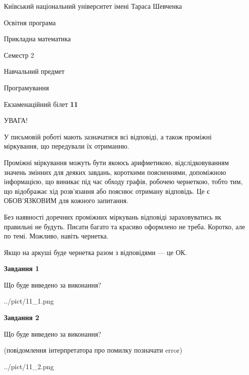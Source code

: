 \documentclass[12pt, ukrainian]{article}
\begin{document}
{{\begin {small}\par
{ \center  Київський національний університет імені Тараса Шевченка \par}
{\parbox {5 cm}{Освітня програма \hfill}{\parbox {7 cm}{Прикладна математика\hfill}}\parbox {6 cm}{\hfill Семестр 2}}\par
{\parbox {5 cm} {Навчальний предмет \hfill}\parbox {7 cm}{Програмування \hfill}\parbox {6cm}{\hfill}\par}\vspace{-7pt} \end{small}}{\center Екзаменаційний білет \No \textbf
{ 11 }\par}}
{
\begin {large}
УВАГА!

У письмовій роботі мають зазначатися всі відповіді, а також проміжні міркування, що передували їх отриманню.

Проміжні міркування можуть бути якоюсь арифметикою, відслідковуванням зна\-чень змінних для деяких завдань,
короткими поясненнями, допоміжною інформацією, що виникає під час обходу графів, робочею чернеткою,
тобто тим, що відображає хід розв’язання або пояснює отриману відповідь.
Це є ОБОВ’ЯЗКОВИМ для кожного запитання.

Без наявності доречних проміжних міркувань відповіді зараховуватись як правиль\-ні не будуть.
Писати багато та красиво оформлено не треба. Коротко, але по темі. Можли\-во, навіть чернетка.

Якщо на аркуші буде чернетка разом з відповідями --- це ОК.

\newpage

{\begin {center}\textbf{Завдання 1}\end {center}}\par
Що буде виведено за виконання?\par
\begin{center}
	{../pict/11_1.png}
\end{center}
\newpage

{\begin {center}\textbf{Завдання 2}\end {center}}\par
Що буде виведено за виконання?\par
 (повідомлення інтерпретатора про помилку позначати error)\par
\begin{center}
	{../pict/11_2.png}
\end{center}
\newpage


\end{large}}
\end{document}

